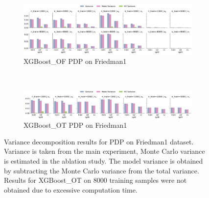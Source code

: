 \documentclass[runningheads]{llncs}
\begin{document}
\begin{figure}[htbp]
    \centering
    \begin{subfigure}[b]{\textwidth}
        \includegraphics[width=\textwidth]{img/Friedman1-all/variance_decomposition_pdp_XGBoost_OF.png}
        \caption{XGBoost\_OF PDP on Friedman1}
    \end{subfigure}
    \\[10pt]
    \vfill
    \begin{subfigure}[b]{\textwidth}
        \includegraphics[width=\textwidth]{img/Friedman1-all/variance_decomposition_pdp_XGBoost_OT.png}
        \caption{XGBoost\_OT PDP on Friedman1}
    \end{subfigure}
    \caption{Variance decomposition results for PDP on Friedman1 dataset. Variance is taken from the
    main experiment, Monte Carlo variance is estimated in the ablation study. The model variance is
    obtained by subtracting the Monte Carlo variance from the total variance. Results for XGBoost\_OT
    on 8000 training samples were not obtained due to excessive computation time.}
    \label{fig:pdp-variance-decomp-friedman1}  %
\end{figure}
\end{document}
